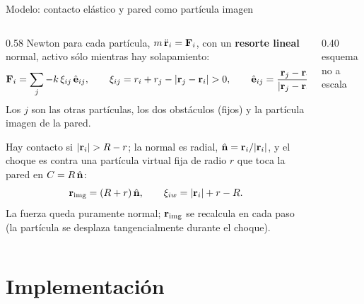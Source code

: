 \documentclass[aspectratio=169,11pt]{beamer}
\begin{document}
\begin{frame}{Modelo: contacto elástico y pared como partícula imagen}
    \begin{columns}[c,onlytextwidth]
        \begin{column}{0.58\textwidth}
            \small
            \setlength{\abovedisplayskip}{4pt}\setlength{\belowdisplayskip}{4pt}
            Newton para cada partícula, $m\,\ddot{\mathbf{r}}_i = \mathbf{F}_i$, con un
            \textbf{resorte lineal} normal, activo sólo mientras hay solapamiento:
            \[
                \mathbf{F}_i = \sum_j -k\,\xi_{ij}\,\hat{\mathbf{e}}_{ij}, \qquad
                \xi_{ij} = r_i + r_j - |\mathbf{r}_j - \mathbf{r}_i| > 0, \qquad
                \hat{\mathbf{e}}_{ij} = \frac{\mathbf{r}_j - \mathbf{r}_i}{|\mathbf{r}_j - \mathbf{r}_i|}
            \]
            Los $j$ son las otras partículas, los dos obstáculos (fijos) y la
            partícula imagen de la pared.
            \vspace{0.5em}

             Hay contacto si $|\mathbf{r}_i| > R - r$; la normal es radial,
            $\hat{\mathbf{n}} = \mathbf{r}_i/|\mathbf{r}_i|$, y el choque es contra una partícula virtual fija
            de radio $r$ que toca la pared en $C = R\,\hat{\mathbf{n}}$:
            \[
                \mathbf{r}_{\text{img}} = (R + r)\,\hat{\mathbf{n}}, \qquad
                \xi_{iw} = |\mathbf{r}_i| + r - R .
            \]
            La fuerza queda puramente normal; $\mathbf{r}_{\text{img}}$ se recalcula en cada
            paso (la partícula se desplaza tangencialmente durante el choque).
        \end{column}\hfill
        \begin{column}{0.40\textwidth}
            \centering
            \\[0.3em]
            {\footnotesize\color{gris} esquema no a escala}
        \end{column}
    \end{columns}
\end{frame}


\section{Implementación}
\end{document}
